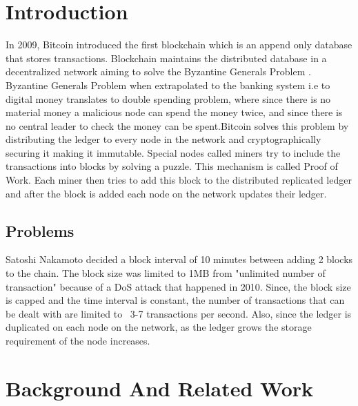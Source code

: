 \documentclass[conference]{IEEEtran}
\begin{document}
\section{Introduction}
In 2009, Bitcoin\cite{bitcoin} introduced the first blockchain which is an
append only database that stores transactions. Blockchain maintains the
distributed database in a decentralized network aiming to solve the Byzantine
Generals Problem \cite{bgp}. Byzantine Generals Problem when extrapolated to
the banking system i.e to digital money translates to double spending problem,
where since there is no material money a malicious node can spend the money
twice, and since there is no central leader to check the money can be
spent.Bitcoin solves this problem by distributing the ledger to
every node in the network and cryptographically securing it making it immutable.
Special nodes called miners try to include the transactions into blocks by
solving a puzzle. This mechanism is called Proof of Work. Each miner then tries
to add this block to the distributed replicated ledger and after the block is
added each node on the network updates their ledger. \\

\subsection{Problems}
Satoshi Nakamoto decided a block interval of 10 minutes between adding 2 blocks
to the chain. The block size was limited to 1MB from "unlimited number of
transaction" because of a DoS attack that happened in 2010.  Since, the block
size is capped and the time interval is constant, the number of transactions
that can be dealt with are limited to ~3-7 transactions per second.  Also, since
the ledger is duplicated on each node on the network, as the ledger grows the
storage requirement of the node increases. 

\section{Background And Related Work}
\\
\end{document}
